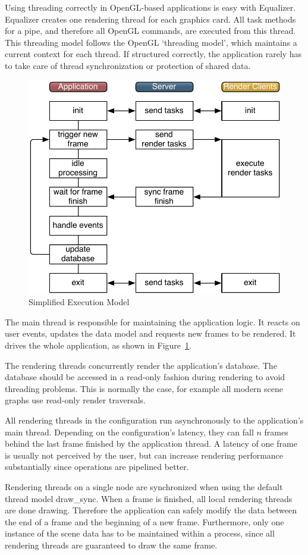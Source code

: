\documentclass[10pt,a4]{scrartcl}
\newcommand{\fig}[1]{Figure~\ref{#1}}
\begin{document}
Using threading correctly in OpenGL-based applications is easy with
Equalizer. Equalizer creates one rendering thread for each graphics
card. All task methods for a pipe, and therefore all OpenGL commands,
are executed from this thread. This threading model follows the OpenGL
`threading model', which maintains a current context for each
thread. If structured correctly, the application rarely has to take care
of thread synchronization or protection of shared data.

\begin{figure}
  \includegraphics[width=.618\textwidth]{images/model.pdf}
  {\caption{\label{fModel}Simplified Execution Model}}
\end{figure}
The main thread is responsible for maintaining the application logic. It
reacts on user events, updates the data model and requests new frames to
be rendered. It drives the whole application, as shown in \fig{fModel}.

The rendering threads concurrently render the application's
database. The data\-base should be accessed in a read-only fashion
during rendering to avoid threading problems. This is normally the case,
for example all modern scene graphs use read-only render traversals.

All rendering threads in the configuration run asynchronously to the
application's main thread. Depending on the configuration's latency,
they can fall $n$ frames behind the last frame finished by the
application thread. A latency of one frame is usually not perceived by
the user, but can increase rendering performance substantially since
operations are pipelined better.

Rendering threads on a single node are synchronized when using the
default thread model \textsf{draw\_sync}. When a frame is finished, all
local rendering threads are done drawing. Therefore the application can
safely modify the data between the end of a frame and the beginning of a
new frame. Furthermore, only one instance of the scene data has to be
maintained within a process, since all rendering threads are guaranteed
to draw the same frame.
\end{document}

